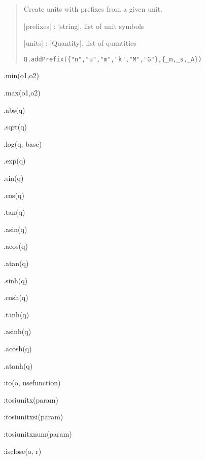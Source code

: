 \documentclass{ltxdoc}
\begin{document}
\begin{quote}
  Create units with prefixes from a given unit.

  \begin{description}
  \item |prefixes| : |{string}|, list of unit symbols

  \item |units| : |{Quantity}|, list of quantities
  \end{description}


\begin{lstlisting}
Q.addPrefix({"n","u","m","k","M","G"},{_m,_s,_A})
\end{lstlisting}
\end{quote}








\newpage

.min(o1,o2)

.max(o1,o2)

.abs(q)

.sqrt(q)

.log(q, base)

.exp(q)

.sin(q)

.cos(q)

.tan(q)

.asin(q)

.acos(q)

.atan(q)

.sinh(q)

.cosh(q)

.tanh(q)

.asinh(q)

.acosh(q)

.atanh(q)

:to(o, usefunction)

:tosiunitx(param)

:tosiunitxsi(param)

:tosiunitxnum(param)

:isclose(o, r)
\end{document}
